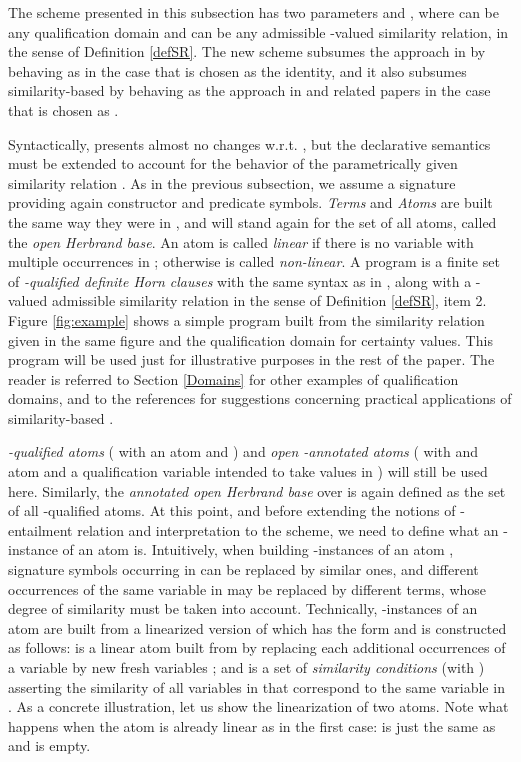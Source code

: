 \documentclass{sigplanconf}
\theoremstyle{definition}
\theoremstyle{plain}
\begin{document}
The scheme  presented in this subsection has two parameters  and , where  can be any qualification domain and  can be any admissible -valued similarity relation, in the sense of Definition \ref{defSR}. The new scheme subsumes the approach in \cite{RR08} by behaving as  in the case that   is chosen as the identity, and it also subsumes similarity-based  by behaving as the approach in \cite{Ses02} and related papers in  the case that  is chosen as .

Syntactically,  presents almost no changes w.r.t. , but the declarative semantics must be extended to account for the behavior of the parametrically given similarity relation .  As in the previous subsection, we assume a signature  providing again constructor and predicate symbols. \emph{Terms} and \emph{Atoms} are built the same way they were in , and  will stand again for the set of all atoms, called the \emph{open Herbrand base}. An atom  is called {\em linear} if there is no variable with multiple occurrences in ; otherwise  is called {\em non-linear}. A  program  is a finite set of \emph{-qualified definite Horn clauses} with the same syntax as in , along with a -valued admissible similarity relation  in the sense of Definition \ref{defSR}, item 2. Figure \ref{fig:example} shows a simple  program built from the similarity relation  given in the same figure and the qualification domain  for certainty values. This program will be used just for illustrative purposes in the rest of the paper. The reader is referred to Section \ref{Domains} for other examples of qualification domains, and to the references \cite{LSS04,MOV04} for suggestions concerning practical applications of similarity-based .

\emph{-qualified atoms} ( with  an atom and ) and \emph{open -annotated atoms} ( with  and atom and  a qualification variable intended to take values in ) will still be used here. Similarly, the \emph{annotated open Herbrand base} over  is again defined as the set  of all -qualified atoms. At this point, and before extending the notions of -entailment relation and interpretation to the  scheme, we need to define what an -instance of an atom is.  Intuitively, when building -instances of an atom , signature symbols occurring in  can be replaced by similar ones, and different occurrences of the same variable in  may be replaced by different terms, whose degree of similarity must be taken into account. Technically, -instances of an atom  are built from a linearized version of  which has the form  and is constructed as follows:  is a linear atom built from  by replacing each  additional occurrences of a variable  by new fresh variables  ; and  is a set of \emph{similarity conditions}  (with ) asserting the similarity of all variables in  that correspond to the same variable  in . As a concrete illustration, let us show the linearization of two atoms. Note what happens when the atom  is already linear as in the first case:  is just the same as  and  is empty.
\end{document}
